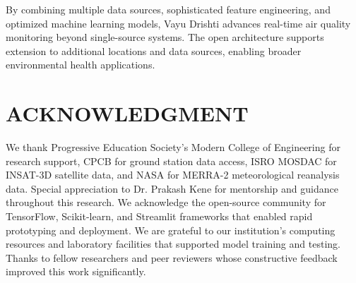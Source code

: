 \documentclass[10pt,twocolumn]{article}
\begin{document}
By combining multiple data sources, sophisticated feature engineering, and optimized machine learning models, Vayu Drishti advances real-time air quality monitoring beyond single-source systems. The open architecture supports extension to additional locations and data sources, enabling broader environmental health applications.

\section*{\centering ACKNOWLEDGMENT}

We thank Progressive Education Society's Modern College of Engineering for research support, CPCB for ground station data access, ISRO MOSDAC for INSAT-3D satellite data, and NASA for MERRA-2 meteorological reanalysis data. Special appreciation to Dr. Prakash Kene for mentorship and guidance throughout this research. We acknowledge the open-source community for TensorFlow, Scikit-learn, and Streamlit frameworks that enabled rapid prototyping and deployment. We are grateful to our institution's computing resources and laboratory facilities that supported model training and testing. Thanks to fellow researchers and peer reviewers whose constructive feedback improved this work significantly.
\end{document}
